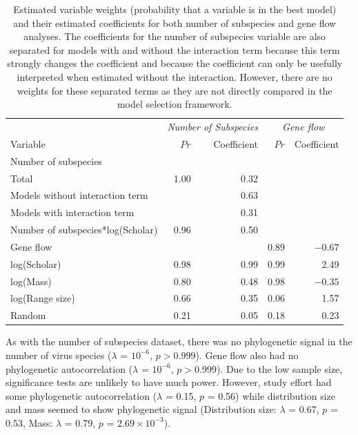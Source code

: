 \begin{table}[t]
\centering
\caption[Estimated variable weights and coefficients]{
Estimated variable weights (probability that a variable is in the best model) and their estimated coefficients for both number of subspecies and gene flow analyses.
The coefficients for the number of subspecies variable are also separated for models with and without the interaction term because this term strongly changes the coefficient and because the coefficient can only be usefully interpreted when estimated without the interaction. 
However, there are no weights for these separated terms as they are not directly compared in the model selection framework.
}
\begin{tabular}{@{}>{\small}l rrrr@{}}
\toprule
& \multicolumn{2}{c}{\textit{Number of Subspecies}} & \multicolumn{2}{c}{\textit{Gene flow}}\\\cmidrule(rl){2-3}\cmidrule(rl){4-5}
\normalsize{Variable} & $Pr$ & Coefficient & $Pr$ & Coefficient\\
\midrule
Number of subspecies &&&&\\
\hspace{3mm}Total & 1.00 & 0.32 &&\\
\hspace{3mm}Models without interaction term &&  0.63 &&\\
\hspace{3mm}Models with interaction term &&  0.31 &&\\
Number of subspecies*log(Scholar) &  0.96 &  0.50 && \\[2.5mm]  
Gene flow & & &  0.89 &  \ensuremath{-0.67}\\[2.5mm]  
log(Scholar) &  0.98 &  0.99 & 
   0.99 &  2.49\\
log(Mass) &  0.80 &  0.48 & 
   0.98 &  \ensuremath{-0.35}\\
log(Range size) &  0.66 &  0.35& 
   0.06 &  1.57\\
Random &  0.21 &  0.05& 
   0.18 &  0.23\\
\bottomrule
\end{tabular}

\label{t:variables}
\end{table}


As with the number of subspecies dataset, there was no phylogenetic signal in the number of virus species ($\lambda$ = \ensuremath{10^{-6}}, $p > 0.999$).
Gene flow also had no phylogenetic autocorrelation ($\lambda$ = \ensuremath{10^{-6}},  $p > 0.999$).
Due to the low sample size, significance tests are unlikely to have much power.
However, study effort had some phylogenetic autocorrelation ($\lambda$ = 0.15, $p$ = 0.56) while distribution size and mass seemed to show phylogenetic signal (Distribution size: $\lambda$ = 0.67, $p$ = 0.53, Mass: $\lambda$ = 0.79, $p$ = \ensuremath{2.69\times 10^{-3}}).


